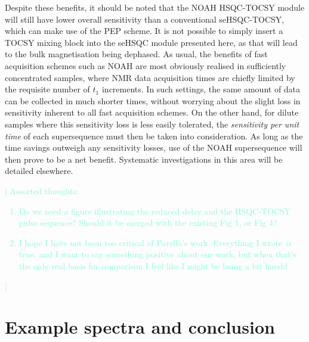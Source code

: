 \documentclass[draft,11pt]{article}
\newcommand*{\hl}[1]{\textcolor{Aquamarine}{[#1]}}
\begin{document}
Despite these benefits, it should be noted that the NOAH HSQC-TOCSY module will still have lower overall sensitivity than a conventional seHSQC-TOCSY, which can make use of the PEP scheme.
It is not possible to simply insert a TOCSY mixing block into the seHSQC module presented here, as that will lead to the bulk magnetisation being dephased.
As usual, the benefits of fast acquisition schemes such as NOAH are most obviously realised in sufficiently concentrated samples, where NMR data acquisition times are chiefly limited by the requisite number of $t_1$ increments.
In such settings, the same amount of data can be collected in much shorter times, without worrying about the slight loss in sensitivity inherent to all fast acquisition schemes.
On the other hand, for dilute samples where this sensitivity loss is less easily tolerated, the \textit{sensitivity per unit time} of each supersequence must then be taken into consideration.
As long as the time savings outweigh any sensitivity losses, use of the NOAH supersequence will then prove to be a net benefit.
Systematic investigations in this area will be detailed elsewhere.

\hl{
    Assorted thoughts:
    \begin{enumerate}
        \item Do we need a figure illustrating the reduced delay and the HSQC-TOCSY pulse sequence? Should it be merged with the existing Fig 1, or Fig 4?
        \item I hope I have not been too critical of Parella's work. Everything I wrote \textit{is} true, and I want to say something positive about our work, but when that's the only real basis for comparison I feel like I might be being a bit harsh!
    \end{enumerate}
}

\section*{Example spectra and conclusion}
\end{document}
